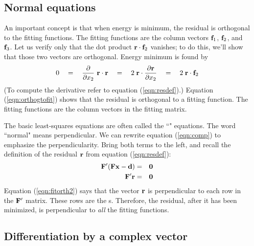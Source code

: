 \subsection{Normal equations}
\par

An important concept is that when energy is minimum,
the residual is orthogonal to the fitting functions.
The fitting functions are the column vectors
$\bold f_1$, $\bold f_2$, and $\bold f_3$.
Let us verify only that the dot product $ \bold r \cdot \bold f_2 $ vanishes;
to do this, we'll show
that those two vectors are orthogonal.
Energy minimum is found by
\begin{equation}
0  \quad = \quad {\partial\over \partial x_2}\ \bold r \cdot \bold r
   \quad = \quad 2\; \bold r \cdot {\partial \bold r\over \partial x_2}
   \quad = \quad 2\; \bold r \cdot \bold f_2
\label{eqn:orthogtofit}
\end{equation}
(To compute the derivative refer to equation (\ref{eqn:resdef}).)
Equation (\ref{eqn:orthogtofit}) shows that
the residual is orthogonal to a fitting function.
The fitting functions are the column vectors in the fitting matrix.

\par
The basic least-squares equations are often called
the ``" equations.
The word ``normal" means perpendicular.
We can rewrite equation
(\ref{eqn:comp})
to emphasize the perpendicularity.
Bring both terms to the left,
and recall the definition of the residual $\bold r$
from equation (\ref{eqn:resdef}):
\begin{eqnarray}
\label{eqn:fitorth1}
\bold F' ( \bold F   \bold x - {\bf d})  &=& \bold 0  \\
\bold F'  \bold r                    &=& \bold 0 
\label{eqn:fitorth2}
\end{eqnarray}
Equation (\ref{eqn:fitorth2}) says that the  vector $\bold r$
is perpendicular to
each row in the $\bold F'$ matrix.
These rows are the s.
Therefore, the residual, after it has been minimized,
is perpendicular to
{\it all}
the fitting functions.

\subsection{Differentiation by a complex vector}

